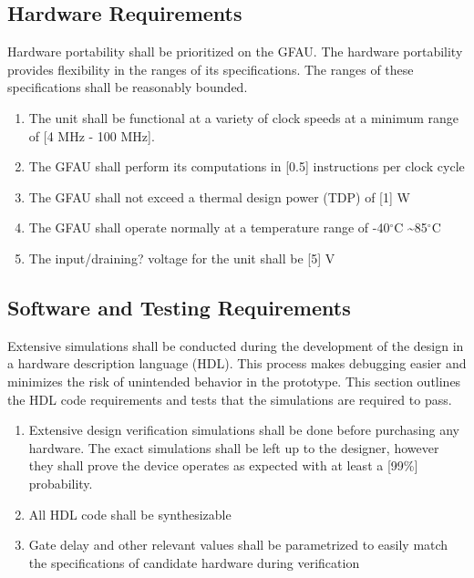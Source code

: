 \documentclass[paper=usletter, fontsize=14pt]{article}
\begin{document}
        \subsection{Hardware Requirements}
        Hardware portability shall be prioritized on the GFAU. The hardware portability provides flexibility in the ranges of its specifications. The ranges of these specifications shall be reasonably bounded.

        \begin{enumerate}

            \item The unit shall be functional at a variety of clock speeds at a minimum range of [4 MHz - 100 MHz].

            \item The GFAU shall perform its computations in [0.5] instructions per clock cycle

            \item The GFAU shall not exceed a thermal design power (TDP) of [1] W

            \item The GFAU shall operate normally at a temperature range of -40$^{\circ}$C \textasciitilde 85$^{\circ}$C

            \item The input/draining? voltage for the unit shall be [5] V

        \end{enumerate}

        \subsection{Software and Testing Requirements}
        Extensive simulations shall be conducted during the development of the design in a hardware description language (HDL). This process makes debugging easier and minimizes the risk of unintended behavior in the prototype. This section outlines the HDL code requirements and tests that the simulations are required to pass.

        \begin{enumerate}

            \item Extensive design verification simulations shall be done before purchasing any hardware. The exact simulations shall be left up to the designer, however they shall prove the device operates as expected with at least a [99\%] probability. 

            \item All HDL code shall be synthesizable

            \item Gate delay and other relevant values shall be parametrized to easily match the specifications of candidate hardware during verification

        \end{enumerate}
\end{document}
